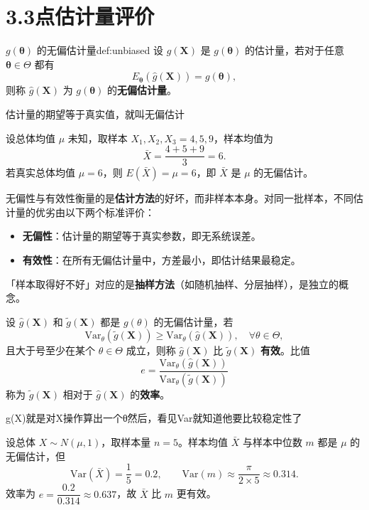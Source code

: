 \section{3.3点估计量评价}
\begin{definition}{$g(\boldsymbol{\theta})$ 的无偏估计量}{def:unbiased}
设 $\hat{g}(\boldsymbol{X})$ 是 $g(\boldsymbol{\theta})$ 的估计量，若对于任意 $\boldsymbol{\theta} \in \Theta$ 都有
\[
E_{\boldsymbol{\theta}}(\hat{g}(\boldsymbol{X})) = g(\boldsymbol{\theta}),
\]
则称 $\hat{g}(\boldsymbol{X})$ 为 $g(\boldsymbol{\theta})$ 的\textbf{无偏估计量}。
\end{definition}
 估计量的期望等于真实值，就叫无偏估计
\begin{example}[样本均值是总体均值的无偏估计]
设总体均值 $\mu$ 未知，取样本 $X_1, X_2, X_3 = 4, 5, 9$，样本均值为
\[
  \bar{X} = \frac{4+5+9}{3} = 6.
\]
若真实总体均值 $\mu = 6$，则 $E(\bar{X}) = \mu = 6$，即 $\bar{X}$ 是 $\mu$ 的无偏估计。
\end{example}
\begin{note}
无偏性与有效性衡量的是\textbf{估计方法}的好坏，而非样本本身。对同一批样本，不同估计量的优劣由以下两个标准评价：
\begin{itemize}
  \item \textbf{无偏性}：估计量的期望等于真实参数，即无系统误差。
  \item \textbf{有效性}：在所有无偏估计量中，方差最小，即估计结果最稳定。
\end{itemize}
「样本取得好不好」对应的是\textbf{抽样方法}（如随机抽样、分层抽样），是独立的概念。
\end{note}
\begin{definition}[有效估计量]
设 $\hat{g}(\boldsymbol{X})$ 和 $\tilde{g}(\boldsymbol{X})$ 都是 $g(\theta)$ 的无偏估计量，若
\[
  \mathrm{Var}_\theta(\tilde{g}(\boldsymbol{X})) \geq \mathrm{Var}_\theta(\hat{g}(\boldsymbol{X})), \quad \forall \theta \in \Theta,
\]
且大于号至少在某个 $\theta \in \Theta$ 成立，则称 $\hat{g}(\boldsymbol{X})$ 比 $\tilde{g}(\boldsymbol{X})$ \textbf{有效}。比值
\[
  e = \frac{\mathrm{Var}_\theta(\hat{g}(\boldsymbol{X}))}{\mathrm{Var}_\theta(\tilde{g}(\boldsymbol{X}))}
\]
称为 $\tilde{g}(\boldsymbol{X})$ 相对于 $\hat{g}(\boldsymbol{X})$ 的\textbf{效率}。
\end{definition}
\begin{dxtips}
    g(X)就是对X操作算出一个θ然后，看见Var就知道他要比较稳定性了
\end{dxtips}
\begin{example}[样本均值与样本中位数的有效性比较]
设总体 $X \sim N(\mu, 1)$，取样本量 $n = 5$。样本均值 $\bar{X}$ 与样本中位数 $m$ 都是 $\mu$ 的无偏估计，但
\[
  \mathrm{Var}(\bar{X}) = \frac{1}{5} = 0.2, \qquad \mathrm{Var}(m) \approx \frac{\pi}{2 \times 5} \approx 0.314.
\]
效率为 $e = \dfrac{0.2}{0.314} \approx 0.637$，故 $\bar{X}$ 比 $m$ 更有效。
\end{example}
